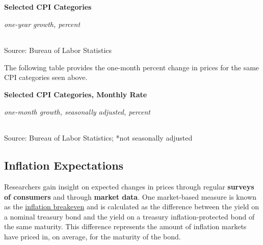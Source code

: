 \documentclass{report}
\begin{document}
{\begin{minipage}{0.76\textwidth}
\normalsize \textbf{Selected CPI Categories}\\
\footnotesize{\textit{one-year growth, percent}\\
\hspace*{-3mm}  \setlength{\tabcolsep}{2.6pt} \color{black!90}
		{\renewcommand{\arraystretch}{1.5}
\begin{tabular}{p{42mm} R{8.0mm} R{8.0mm} R{8.0mm} R{8.0mm}
		 		 R{8.0mm} R{10.0mm} R{12.0mm}} %
			  \hline
		\end{tabular}}}
\vspace{-2mm}		
		
\footnotesize{Source: Bureau of Labor Statistics}
\end{minipage}
\newpage
\begin{minipage}{0.76\textwidth}
\small The following table provides the one-month percent change in prices for the same CPI categories seen above. 
\end{minipage}
\vspace{1.5mm}

\normalsize \textbf{Selected CPI Categories, Monthly Rate}\\
\footnotesize{\textit{one-month growth, seasonally adjusted, percent}\\
\hspace*{-3mm}  \setlength{\tabcolsep}{2.6pt} \color{black!90}
		{\renewcommand{\arraystretch}{1.5}
\begin{tabular}{p{38mm} R{8.2mm} R{8.2mm} R{8.2mm} R{8.2mm} R{8.2mm} R{8.2mm} 
		R{8.2mm} R{8.2mm}} %
			  \hline
		\end{tabular}}}
\vspace{-2mm}		
		
\footnotesize{Source: Bureau of Labor Statistics; *not seasonally adjusted}
\newpage
\hypertarget{prie}{}
\begin{minipage}{0.76\textwidth}
\subsection*{Inflation Expectations}
\vspace{-1mm}

\small Researchers gain insight on expected changes in prices through regular \textbf{surveys of consumers} and through \textbf{market data}. One market-based measure is known as the \href{https://fred.stlouisfed.org/series/T5YIE}{inflation breakeven} and is calculated as the difference between the yield on a nominal treasury bond and the yield on a treasury inflation-protected bond of the same maturity. This difference represents the amount of inflation markets have priced in, on average, for the maturity of the bond.
\end{minipage}

}
\end{document}
